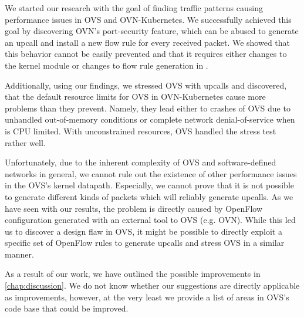 

We started our research with the goal of finding traffic patterns causing performance issues in OVS and OVN-Kubernetes. We successfully achieved this goal by discovering OVN's port-security feature, which can be abused to generate an upcall and install a new flow rule for every received packet. We showed that this behavior cannot be easily prevented and that it requires either changes to the kernel module or changes to flow rule generation in .

Additionally, using our findings, we stressed OVS with upcalls and discovered, that the default resource limits for OVS in OVN-Kubernetes cause more problems than they prevent. Namely, they lead either to crashes of OVS due to unhandled out-of-memory conditions or complete network denial-of-service when  is CPU limited. With unconstrained resources, OVS handled the stress test rather well.

Unfortunately, due to the inherent complexity of OVS and software-defined networks in general, we cannot rule out the existence of other performance issues in the OVS's kernel datapath. Especially, we cannot prove that it is not possible to generate different kinds of packets which will reliably generate upcalls. As we have seen with our results, the problem is directly caused by OpenFlow configuration generated with an external tool to OVS (e.g. OVN). While this led us to discover a design flaw in OVS, it might be possible to directly exploit a specific set of OpenFlow rules to generate upcalls and stress OVS in a similar manner.

As a result of our work, we have outlined the possible improvements in \cref{chap:discussion}. We do not know whether our suggestions are directly applicable as improvements, however, at the very least we provide a list of areas in OVS's code base that could be improved.

